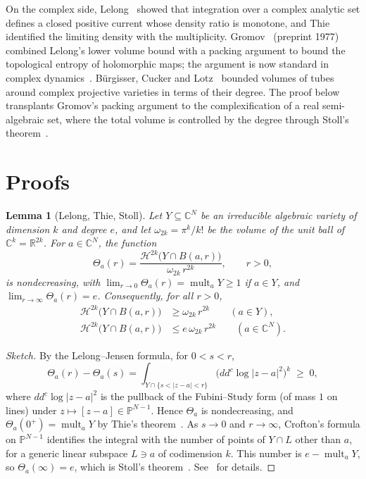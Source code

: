 \documentclass[11pt]{article}
\newtheorem{lemma}[theorem]{Lemma}
\newcommand{\R}{\mathbb{R}}
\newcommand{\C}{\mathbb{C}}
\newcommand{\PP}{\mathbb{P}}
\newcommand{\cH}{\mathcal{H}}
\DeclareMathOperator{\mult}{mult}
\begin{document}
On the complex side, Lelong~\cite{Le57} showed that integration over a complex
analytic set defines a closed positive current whose density ratio is monotone,
and Thie~\cite{Th67} identified the limiting density with the multiplicity.
Gromov~\cite{Gr03} (preprint 1977) combined Lelong's lower volume bound with a
packing argument to bound the topological entropy of holomorphic maps; the
argument is now standard in complex dynamics~\cite{DS10}. B\"urgisser, Cucker
and Lotz~\cite{BCL06} bounded volumes of tubes around complex projective
varieties in terms of their degree. The proof below transplants Gromov's packing
argument to the complexification of a real semi-algebraic set, where the total
volume is controlled by the degree through Stoll's theorem~\cite{St64}.

\section{Proofs}

\begin{lemma}[Lelong, Thie, Stoll]\label{lem:lelong}
Let $Y\subseteq\C^N$ be an irreducible algebraic variety of dimension $k$ and
degree $e$, and let $\omega_{2k}=\pi^k/k!$ be the volume of the unit ball of
$\C^k=\R^{2k}$. For $a\in\C^N$, the function
\[
  \Theta_a(r)=\frac{\cH^{2k}\bigl(Y\cap B(a,r)\bigr)}{\omega_{2k}\,r^{2k}},
  \qquad r>0,
\]
is nondecreasing, with $\lim_{r\to0}\Theta_a(r)=\mult_a Y\ge1$ if $a\in Y$, and
$\lim_{r\to\infty}\Theta_a(r)=e$. Consequently, for all $r>0$,
\begin{align}
  \cH^{2k}\bigl(Y\cap B(a,r)\bigr) &\ge \omega_{2k}\,r^{2k}
    \qquad (a\in Y), \label{eq:lower}\\
  \cH^{2k}\bigl(Y\cap B(a,r)\bigr) &\le e\,\omega_{2k}\,r^{2k}
    \qquad (a\in\C^N). \label{eq:upper}
\end{align}
\end{lemma}

\begin{proof}[Sketch]
By the Lelong--Jensen formula, for $0<s<r$,
\[
  \Theta_a(r)-\Theta_a(s)=\int_{Y\cap\{s<|z-a|<r\}}
  \bigl(dd^c\log|z-a|^2\bigr)^k\;\ge\;0,
\]
where $dd^c\log|z-a|^2$ is the pullback of the Fubini--Study form (of mass $1$
on lines) under $z\mapsto[z-a]\in\PP^{N-1}$. Hence $\Theta_a$ is nondecreasing,
and $\Theta_a(0^+)=\mult_aY$ by Thie's theorem~\cite{Th67}. As $s\to0$ and
$r\to\infty$, Crofton's formula on $\PP^{N-1}$ identifies the integral with the
number of points of $Y\cap L$ other than $a$, for a generic linear subspace
$L\ni a$ of codimension $k$. This number is $e-\mult_aY$, so
$\Theta_a(\infty)=e$, which is Stoll's theorem~\cite{St64}. See~\cite{Ch89,De12}
for details.
\end{proof}
\end{document}
